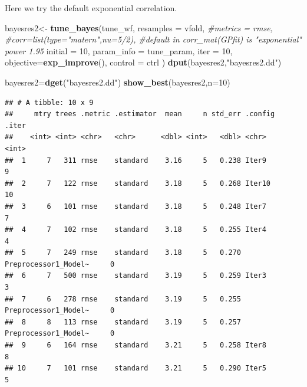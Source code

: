 \documentclass[
  ignorenonframetext,
]{beamer}
\newenvironment{Shaded}{\begin{snugshade}}{\end{snugshade}}
\newcommand{\CommentTok}[1]{\textcolor[rgb]{0.56,0.35,0.01}{\textit{#1}}}
\newcommand{\DataTypeTok}[1]{\textcolor[rgb]{0.13,0.29,0.53}{#1}}
\newcommand{\DecValTok}[1]{\textcolor[rgb]{0.00,0.00,0.81}{#1}}
\newcommand{\KeywordTok}[1]{\textcolor[rgb]{0.13,0.29,0.53}{\textbf{#1}}}
\newcommand{\NormalTok}[1]{#1}
\newcommand{\StringTok}[1]{\textcolor[rgb]{0.31,0.60,0.02}{#1}}
\begin{document}
\begin{frame}[fragile]

Here we try the default exponential correlation.

\begin{Shaded}
\begin{Highlighting}[]
\NormalTok{bayesres2<-}\StringTok{ }\KeywordTok{tune_bayes}\NormalTok{(tune_wf,}
    \DataTypeTok{resamples =}\NormalTok{ vfold,}
    \CommentTok{#metrics = rmse,}
    \CommentTok{#corr=list(type="matern",nu=5/2), }
    \CommentTok{#default in corr_mat(GPfit) is "exponential" power 1.95}
    \DataTypeTok{initial =} \DecValTok{10}\NormalTok{,}
    \DataTypeTok{param_info =}\NormalTok{ tune_param,}
    \DataTypeTok{iter =} \DecValTok{10}\NormalTok{,}
    \DataTypeTok{objective=}\KeywordTok{exp_improve}\NormalTok{(),}
    \DataTypeTok{control =}\NormalTok{ ctrl}
\NormalTok{  )}
\KeywordTok{dput}\NormalTok{(bayesres2,}\StringTok{"bayesres2.dd"}\NormalTok{)}
\end{Highlighting}
\end{Shaded}

\begin{Shaded}
\begin{Highlighting}[]
\NormalTok{bayesres2=}\KeywordTok{dget}\NormalTok{(}\StringTok{"bayesres2.dd"}\NormalTok{)}
\KeywordTok{show_best}\NormalTok{(bayesres2,}\DataTypeTok{n=}\DecValTok{10}\NormalTok{)}
\end{Highlighting}
\end{Shaded}

\begin{verbatim}
## # A tibble: 10 x 9
##     mtry trees .metric .estimator  mean     n std_err .config              .iter
##    <int> <int> <chr>   <chr>      <dbl> <int>   <dbl> <chr>                <int>
##  1     7   311 rmse    standard    3.16     5   0.238 Iter9                    9
##  2     7   122 rmse    standard    3.18     5   0.268 Iter10                  10
##  3     6   101 rmse    standard    3.18     5   0.248 Iter7                    7
##  4     7   102 rmse    standard    3.18     5   0.255 Iter4                    4
##  5     7   249 rmse    standard    3.18     5   0.270 Preprocessor1_Model~     0
##  6     7   500 rmse    standard    3.19     5   0.259 Iter3                    3
##  7     6   278 rmse    standard    3.19     5   0.255 Preprocessor1_Model~     0
##  8     8   113 rmse    standard    3.19     5   0.257 Preprocessor1_Model~     0
##  9     6   164 rmse    standard    3.21     5   0.258 Iter8                    8
## 10     7   101 rmse    standard    3.21     5   0.290 Iter5                    5
\end{verbatim}


\end{frame}
\end{document}
